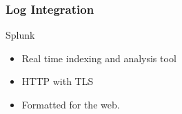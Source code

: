 \begin{frame}
\frametitle{Log Integration}
\begin{block}{Splunk}
\begin{itemize}
\item Real time indexing and analysis tool
\item HTTP with TLS
\item Formatted for the web.
\end{itemize}
\begin{figure}
\end{figure}	
 \end{block}
\end{frame}
